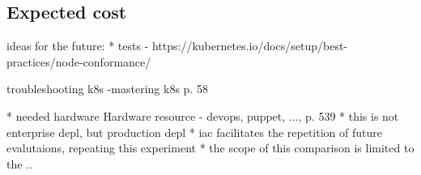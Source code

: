 \subsection{Expected cost}

ideas for the future:
* tests - https://kubernetes.io/docs/setup/best-practices/node-conformance/


troubleshooting k8s -mastering k8s p. 58

* needed hardware Hardware resource - devops, puppet, ..., p. 539
* this is not enterprise depl, but production depl
* iac facilitates the repetition of future evalutaions, repeating this experiment
* the scope of this comparison is limited to the ..
